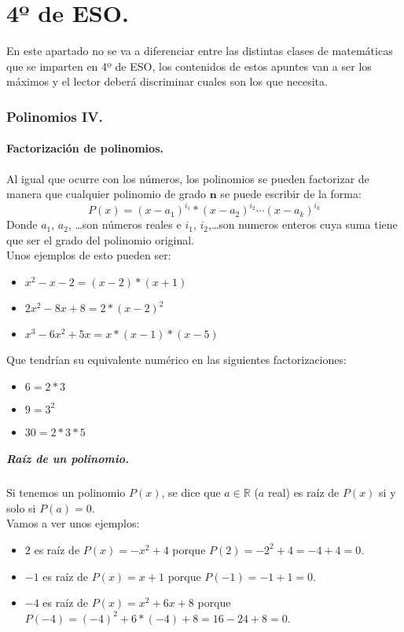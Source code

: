 \documentclass[a4paper,11pt,answers]{exam}
\newcommand{\realset}{\mathbb{R}}
\begin{document}
\part{4º de ESO.}
En este apartado no se va a diferenciar entre las distintas clases de matemáticas que se imparten en 4º de ESO, los contenidos de estos apuntes van a ser los máximos y el lector deberá discriminar cuales son los que necesita.
\section{Polinomios IV.}
\subsection{Factorización de polinomios.}
Al igual que ocurre con los números, los polinomios se pueden factorizar de manera que cualquier polinomio de grado $\boldsymbol{n}$ se puede escribir de la forma:
\[P(x) = (x-a_1)^{i_1} * (x-a_2)^{i_2} \cdots (x-a_k)^{i_k}\]
Donde $a_1$, $a_2$, \dots son números reales e $i_1$, $i_2$,\dots son numeros enteros cuya suma tiene que ser el grado del polinomio original.\\

Unos ejemplos de esto pueden ser:
\begin{itemize}
\item $x^2 - x -2 = (x-2)*(x+1)$
\item $2x^2 - 8x + 8 = 2*(x-2)^2$
\item $x^3 - 6x^2 + 5x = x*(x-1)*(x-5)$
\end{itemize}
Que tendrían su equivalente numérico en las siguientes factorizaciones:
\begin{itemize}
\item $6= 2*3$
\item $9 = 3^2$
\item $30 = 2*3*5$
\end{itemize}
\subsubsection{Raíz de un polinomio.}
Si tenemos un polinomio $P(x)$, se dice que $a \in \realset$ ($a$ real) es raíz de $P(x)$ si y solo si $P(a) = 0$.\\

Vamos a ver unos ejemplos:
\begin{itemize}
\item $2$ es raíz de $P(x) = -x^2 + 4$ porque $P(2) = -2^2 + 4= -4+4 = 0$.
\item $-1$ es raíz de $P(x) = x+1$ porque $P(-1) = -1 + 1 = 0$.
\item $-4$ es raíz de $P(x) = x^2 + 6x + 8$ porque $P(-4) =
  (-4)^2 +6*(-4) + 8 = 16-24 + 8 = 0$.
\end{itemize}
\end{document}
